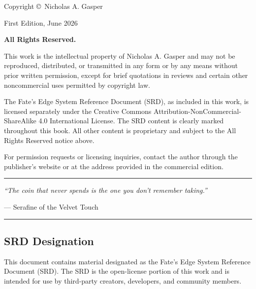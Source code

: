 \documentclass[10pt]{article}
\begin{document}
Copyright \copyright\ Nicholas A. Gasper

First Edition, June 2026

\vspace{0.5cm}

\textbf{All Rights Reserved.}

This work is the intellectual property of Nicholas A. Gasper and may not be reproduced, distributed, or transmitted in any form or by any means without prior written permission, except for brief quotations in reviews and certain other noncommercial uses permitted by copyright law.

\vspace{0.3cm}

The Fate's Edge System Reference Document (SRD), as included in this work, is licensed separately under the Creative Commons Attribution-NonCommercial-ShareAlike 4.0 International License. The SRD content is clearly marked throughout this book. All other content is proprietary and subject to the All Rights Reserved notice above.

\vspace{0.3cm}

For permission requests or licensing inquiries, contact the author through the publisher's website or at the address provided in the commercial edition.

\vspace{1cm}

\begin{center}
\rule{0.4\textwidth}{0.5pt}

\textit{``The coin that never spends is the one you don't remember taking.''}

--- Serafine of the Velvet Touch

\rule{0.4\textwidth}{0.5pt}
\end{center}

\vspace{0.5cm}

\subsection*{SRD Designation}

This document contains material designated as the Fate's Edge System Reference Document (SRD). The SRD is the open-license portion of this work and is intended for use by third-party creators, developers, and community members.
\end{document}
